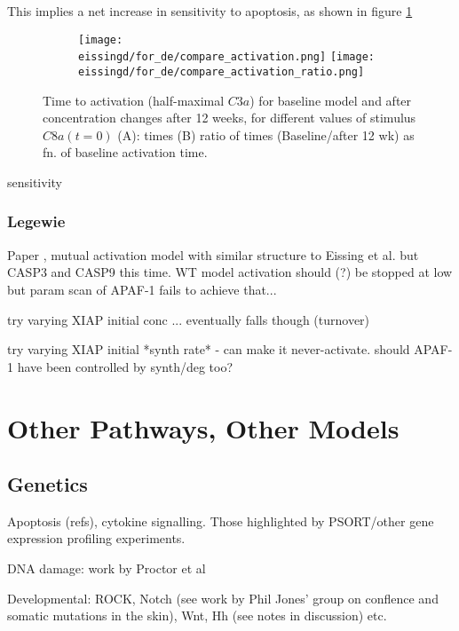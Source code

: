 \documentclass[a4paper,10pt]{report}
\newcommand{\psortbase}{/home/ngrs2/work/bsu/PSORT_Zuliani_Reynolds/}
\newcommand{\apobase}{\psortbase/apoptosis/}
\newcommand{\eissingd}{\apobase/eissing/}
\begin{document}
This implies a net increase in sensitivity to apoptosis, as shown in figure \ref {fig:eissing_compare_act}
\begin{figure}[h!]
  \begin{subfigure}{\textwidth}
    \subcaptionbox{}
    {\texttt{[image: \\eissingd/for\_de/compare\_activation.png]}}
    \subcaptionbox{}
    {\texttt{[image: \\eissingd/for\_de/compare\_activation\_ratio.png]}}
  \end{subfigure}
  \caption{Time to activation (half-maximal $C3a$) for baseline model and
    after concentration changes after 12 weeks, for different values of stimulus $C8a(t=0)$ (A): times (B) ratio of times (Baseline/after 12 wk) as fn. of baseline activation time.}
  \label{fig:eissing_compare_act}
\end{figure}


  

sensitivity


\subsection{Legewie}

Paper \cite{legewie2006mathematical}, mutual activation model with similar structure to Eissing et al. but CASP3 and CASP9 this time. 
WT model activation should (?) be stopped at low but param scan of APAF-1
fails to achieve that... 

try varying XIAP initial conc  ... eventually falls though (turnover)

try varying XIAP initial *synth rate*  - can make it never-activate.
should APAF-1 have been controlled by synth/deg too?

\chapter{Other Pathways, Other Models}

\section{Genetics}

Apoptosis (refs), cytokine signalling. Those highlighted by PSORT/other gene expression profiling experiments. 

DNA damage: work by Proctor et al \cite{passos2010feedback}


Developmental: ROCK, Notch (see work by Phil Jones' group on conflence and somatic mutations in the skin), Wnt, Hh (see notes in discussion) etc. 
\end{document}
